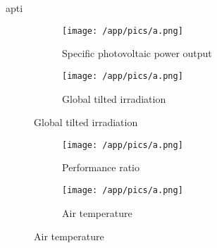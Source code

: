 apti     \documentclass[10pt,a4paper,UTF8]{article}
\begin{document}
{%
\begin{figure}[H]  %
    \begin{minipage}[t]{0.48\textwidth}
    \centering
    \begin{figure}[H]
    \vspace*{-5mm}
    \caption{ Specific photovoltaic power output }
    \texttt{[image: /app/pics/a.png]}
    \end{figure}
    \end{minipage}
    \hfill
\centering
    \begin{minipage}[t]{0.48\textwidth}
    \centering
    \begin{figure}[H]
    \vspace*{-5mm}
    \caption{ Global tilted irradiation }
    \texttt{[image: /app/pics/a.png]}
    \end{figure}
    \end{minipage}
    \hfill
\end{figure}%
\begin{figure}[H]  %
    \begin{minipage}[t]{0.48\textwidth}
    \centering
    \begin{figure}[H]
    \vspace*{-5mm}
    \caption{ Performance ratio }
    \texttt{[image: /app/pics/a.png]}
    \end{figure}
    \end{minipage}
    \hfill
\centering
    \begin{minipage}[t]{0.48\textwidth}
    \centering
    \begin{figure}[H]
    \vspace*{-5mm}
    \caption{ Air temperature }
    \texttt{[image: /app/pics/a.png]}
    \end{figure}
    \end{minipage}
    \hfill
\end{figure}\newpage{}
}
\end{document}
